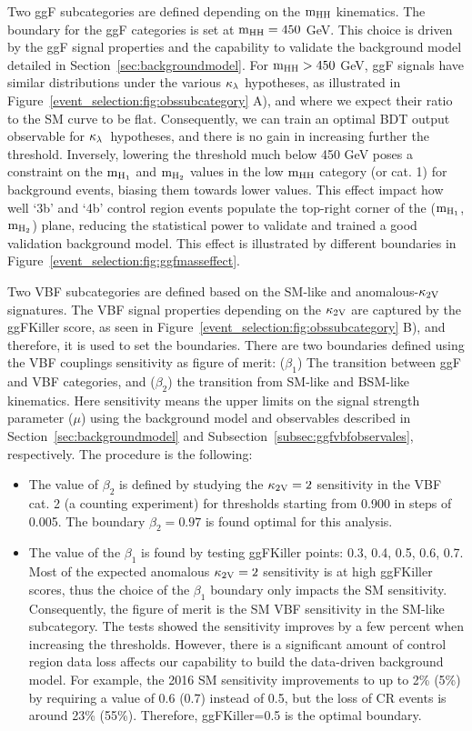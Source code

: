 Two ggF subcategories are defined depending on the $\mathrm{m_{HH}}$ kinematics. The boundary for the ggF categories is set at $\mathrm{m_{HH}}=450$ GeV. This choice is driven by the ggF signal properties and the capability to validate the background model detailed in Section~\ref{sec:backgroundmodel}. For $\mathrm{m_{HH}}>450$ GeV, ggF signals have similar distributions under the various $\kappa_{\lambda}$ hypotheses, as illustrated in Figure~\ref{event_selection:fig:obssubcategory} A), and where we expect their ratio to the SM curve to be flat. Consequently, we can train an optimal BDT output observable for $\kappa_{\lambda}$~hypotheses, and there is no gain in increasing further the threshold. Inversely, lowering the threshold much below 450 GeV poses a constraint on the $\mathrm{m_{H_{1}}}$ and $\mathrm{m_{H_{2}}}$ values in the low $\mathrm{m_{HH}}$ category (or cat. 1) for background events, biasing them towards lower values. This effect impact how well `3b' and `4b' control region events populate the top-right corner of the ($\mathrm{m_{H_{1}}}$, $\mathrm{m_{H_{2}}}$) plane, reducing the statistical power to validate and trained a good validation background model. This effect is illustrated by different boundaries in Figure~\ref{event_selection:fig:ggfmasseffect}.

Two VBF subcategories are defined based on the SM-like and anomalous-$\mathrm{\kappa_{2V} }$ signatures. The VBF signal properties depending on the $\mathrm{\kappa_{2V} }$ are captured by the ggFKiller score, as seen in Figure~\ref{event_selection:fig:obssubcategory} B), and therefore, it is used to set the boundaries. There are two boundaries defined using the VBF couplings sensitivity as figure of merit: ($\beta_{1}$) The transition between ggF and VBF categories, and ($\beta_{2}$) the transition from SM-like and BSM-like kinematics. Here sensitivity means the upper limits on the signal strength parameter ($\mu$) using the background model and observables described in Section~\ref{sec:backgroundmodel} and Subsection~\ref{subsec:ggfvbfobservales}, respectively. The procedure is the following:
\begin{itemize}
    \item The value of $\beta_{2}$ is defined by studying the $\mathrm{\kappa_{2V} } = 2$ sensitivity in the VBF cat. 2 (a counting experiment) for thresholds starting from 0.900 in steps of 0.005. The boundary $\beta_{2}=0.97$ is found optimal for this analysis. 
    \item The value of the $\beta_{1}$ is found by testing ggFKiller points: 0.3, 0.4, 0.5, 0.6, 0.7. Most of the expected anomalous $\mathrm{\kappa_{2V} } = 2$ sensitivity is at high ggFKiller scores, thus the choice of the $\beta_{1}$ boundary only impacts the SM sensitivity. Consequently, the figure of merit is the SM VBF sensitivity in the SM-like subcategory. The tests showed the sensitivity improves by a few percent when increasing the thresholds. However, there is a significant amount of control region data loss affects our capability to build the data-driven background model. For example, the 2016 SM sensitivity improvements to up to 2\% (5\%) by requiring a value of 0.6 (0.7) instead of 0.5, but the loss of CR events is around 23\% (55\%). Therefore, ggFKiller=0.5 is the optimal boundary.
\end{itemize}

